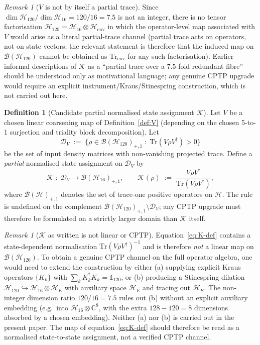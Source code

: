 \documentclass[12pt]{article}
\theoremstyle{definition}
\newtheorem{definition}[theorem]{Definition}
\theoremstyle{remark}
\newtheorem{remark}[theorem]{Remark}
\newcommand{\Hcal}{\mathcal{H}}
\newcommand{\Kcal}{\mathcal{K}}
\newcommand{\Tr}{\mathrm{Tr}}
\newcommand{\Dcal}{\mathcal{D}}
\begin{document}
\begin{remark}[$V$ is not by itself a partial trace]
Since $\dim \Hcal_{120}/\dim \Hcal_{16} = 120/16 = 7.5$ is not an integer, there is no tensor factorisation $\Hcal_{120} = \Hcal_{16} \otimes \Hcal_{\mathrm{env}}$ in which the operator-level map associated with $V$ would arise as a literal partial-trace channel (partial trace acts on operators, not on state vectors; the relevant statement is therefore that the induced map on $\mathcal{B}(\Hcal_{120})$ cannot be obtained as $\mathrm{Tr}_{\mathrm{env}}$ for any such factorisation). Earlier informal descriptions of $\Kcal$ as a ``partial trace over a $7.5$-fold redundant fibre'' should be understood only as motivational language; any genuine CPTP upgrade would require an explicit instrument/Kraus/Stinespring construction, which is not carried out here.
\end{remark}

\begin{definition}[Candidate partial normalised state assignment $\Kcal$]\label{def:K}
Let $V$ be a chosen linear coarsening map of Definition~\ref{def:V} (depending on the chosen 5-to-1 surjection and triality block decomposition). Let
\[
  \Dcal_V \;:=\; \bigl\{ \rho \in \mathcal{B}(\Hcal_{120})_{+,1} \;:\; \Tr(V \rho V^\dagger) > 0 \bigr\}
\]
be the set of input density matrices with non-vanishing projected trace. Define a \emph{partial} normalised state assignment on $\Dcal_V$ by
\begin{equation}\label{eq:K-def}
    \Kcal \;:\; \Dcal_V \longrightarrow \mathcal{B}(\Hcal_{16})_{+,1}, \qquad
    \Kcal(\rho) \;:=\; \frac{V \rho V^\dagger}{\Tr(V \rho V^\dagger)},
\end{equation}
where $\mathcal{B}(\Hcal)_{+,1}$ denotes the set of trace-one positive operators on $\Hcal$. The rule is undefined on the complement $\mathcal{B}(\Hcal_{120})_{+,1} \setminus \Dcal_V$; any CPTP upgrade must therefore be formulated on a strictly larger domain than $\Kcal$ itself.
\end{definition}

\begin{remark}[$\Kcal$ as written is not linear or CPTP]\label{rem:K-not-cptp}
Equation~\eqref{eq:K-def} contains a state-dependent normalisation $\Tr(V\rho V^\dagger)^{-1}$ and is therefore \emph{not} a linear map on $\mathcal{B}(\Hcal_{120})$. To obtain a genuine CPTP channel on the full operator algebra, one would need to extend the construction by either (a) supplying explicit Kraus operators $\{K_k\}$ with $\sum_k K_k^\dagger K_k = \mathbb{1}_{120}$, or (b) producing a Stinespring dilation $\Hcal_{120} \hookrightarrow \Hcal_{16} \otimes \Hcal_E$ with auxiliary space $\Hcal_E$ and tracing out $\Hcal_E$. The non-integer dimension ratio $120/16 = 7.5$ rules out (b) without an explicit auxiliary embedding (e.g.\ into $\Hcal_{16} \otimes \mathbb{C}^8$, with the extra $128 - 120 = 8$ dimensions absorbed by a chosen embedding). Neither (a) nor (b) is carried out in the present paper. The map of equation~\eqref{eq:K-def} should therefore be read as a normalised state-to-state assignment, not a verified CPTP channel.
\end{remark}
\end{document}
